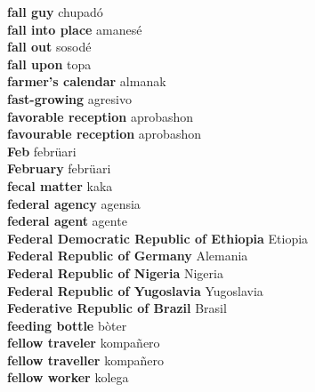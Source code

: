 \textbf{ fall guy  } chupadó \\
\textbf{ fall into place  } amanesé \\
\textbf{ fall out  } sosodé \\
\textbf{ fall upon  } topa \\
\textbf{ farmer’s calendar  } almanak \\
\textbf{ fast-growing  } agresivo \\
\textbf{ favorable reception  } aprobashon \\
\textbf{ favourable reception  } aprobashon \\
\textbf{ Feb  } febrüari \\
\textbf{ February  } febrüari \\
\textbf{ fecal matter  } kaka \\
\textbf{ federal agency  } agensia \\
\textbf{ federal agent  } agente \\
\textbf{ Federal Democratic Republic of Ethiopia  } Etiopia \\
\textbf{ Federal Republic of Germany  } Alemania \\
\textbf{ Federal Republic of Nigeria  } Nigeria \\
\textbf{ Federal Republic of Yugoslavia  } Yugoslavia \\
\textbf{ Federative Republic of Brazil  } Brasil \\
\textbf{ feeding bottle  } bòter \\
\textbf{ fellow traveler  } kompañero \\
\textbf{ fellow traveller  } kompañero \\
\textbf{ fellow worker  } kolega \\
